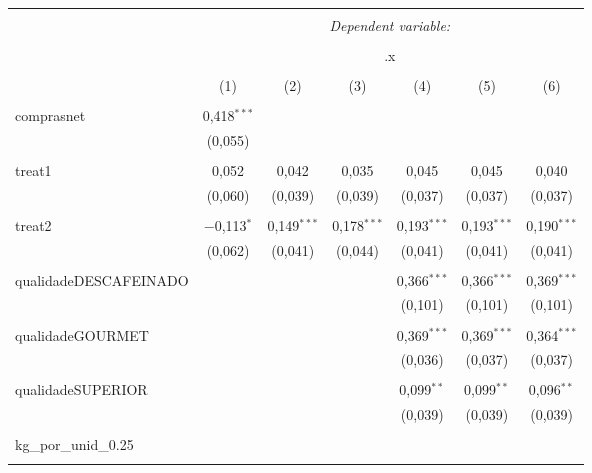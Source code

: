
\begin{table}[!htbp] \centering 
  \caption{} 
  \label{} 
\begin{tabular}{@{\extracolsep{5pt}}lcccccc} 
\\[-1.8ex]\hline 
\hline \\[-1.8ex] 
 & \multicolumn{6}{c}{\textit{Dependent variable:}} \\ 
\cline{2-7} 
\\[-1.8ex] & \multicolumn{6}{c}{.x} \\ 
\\[-1.8ex] & (1) & (2) & (3) & (4) & (5) & (6)\\ 
\hline \\[-1.8ex] 
 comprasnet & 0,418$^{***}$ &  &  &  &  &  \\ 
  & (0,055) &  &  &  &  &  \\ 
  & & & & & & \\ 
 treat1 & 0,052 & 0,042 & 0,035 & 0,045 & 0,045 & 0,040 \\ 
  & (0,060) & (0,039) & (0,039) & (0,037) & (0,037) & (0,037) \\ 
  & & & & & & \\ 
 treat2 & $-$0,113$^{*}$ & 0,149$^{***}$ & 0,178$^{***}$ & 0,193$^{***}$ & 0,193$^{***}$ & 0,190$^{***}$ \\ 
  & (0,062) & (0,041) & (0,044) & (0,041) & (0,041) & (0,041) \\ 
  & & & & & & \\ 
 qualidadeDESCAFEINADO &  &  &  & 0,366$^{***}$ & 0,366$^{***}$ & 0,369$^{***}$ \\ 
  &  &  &  & (0,101) & (0,101) & (0,101) \\ 
  & & & & & & \\ 
 qualidadeGOURMET &  &  &  & 0,369$^{***}$ & 0,369$^{***}$ & 0,364$^{***}$ \\ 
  &  &  &  & (0,036) & (0,037) & (0,037) \\ 
  & & & & & & \\ 
 qualidadeSUPERIOR &  &  &  & 0,099$^{**}$ & 0,099$^{**}$ & 0,096$^{**}$ \\ 
  &  &  &  & (0,039) & (0,039) & (0,039) \\ 
  & & & & & & \\ 
 kg\_por\_unid\_0.25 &  &  &  &  &  &  \\ 
  &  &  &  &  &  &  \\ 

\end{tabular}
\end{table}
